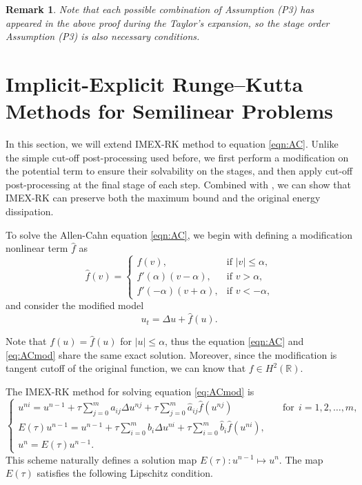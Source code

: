 \documentclass[a4paper, oneside]{book}
\def\bbR{{\mathbb{R}}}
\def\bbR{\mathbb{R}}
\def\hata{{\hat{a}}}
\def\hatb{{\hat{b}}}
\def\hatf{{\hat{f}}}
\newtheorem{remark}{Remark}[section]
\begin{document}
\begin{remark}
Note that each possible combination of Assumption (P3) has appeared in the above proof during the Taylor's expansion, 
so the stage order Assumption (P3) is also necessary conditions. 
\end{remark}

\section{Implicit-Explicit Runge--Kutta Methods for Semilinear Problems}
\label{sec:imex-nonlinear}



In this section, we will extend IMEX-RK method to equation \eqref{eqn:AC}. Unlike the simple cut-off post-processing used before, we first perform a modification on the potential term to ensure their solvability on the stages, and then apply cut-off post-processing at the final stage of each step. Combined with \cite{fu2024energy}, we can show that IMEX-RK can preserve both the maximum bound and the original energy dissipation. 

To solve the Allen-Cahn equation \eqref{eqn:AC}, we begin with defining a modification nonlinear term $\hatf$ as 
\begin{equation}
    \hatf(v)= \begin{cases}
    f(v), & \text{if $\lvert v \rvert \leq \alpha$,}\\ 
    f'(\alpha)(v-\alpha), &\text{if $v > \alpha$,}\\ 
    f'(-\alpha)(v+\alpha), &\text{if $v < -\alpha$,}
\end{cases}\end{equation}
and consider the modified model
\begin{equation}\label{eq:ACmod}
    u_t = \Delta u + \hatf(u).
\end{equation}

Note that $f(u) = \hatf(u)$ for $\lvert u \rvert \leq \alpha$, 
thus the equation \eqref{eqn:AC} and \eqref{eq:ACmod} share the same exact solution. 
Moreover, since the modification is tangent cutoff of the original function, 
we can know that $f \in H^2(\bbR)$. 


The IMEX-RK method for solving equation \eqref{eq:ACmod} is 
\begin{equation}\label{eq:RK-implicit-explicit-semilinear}
    \begin{cases}
    u^{ni} = u^{n-1} + \tau \sum_{j=0}^m a_{ij} \Delta u^{nj} + \tau \sum_{j=0}^m \hata_{ij} \hatf(u^{nj}) &\quad \text{for} ~~i=1,2,\dots,m, \\
    E(\tau) u^{n-1} = u^{n-1} + \tau \sum_{i=0}^m b_i \Delta u^{ni} + \tau \sum_{i=0}^m \hatb_i\hatf(u^{ni}), \\
    u^{n} = E(\tau) u^{n-1}.
  \end{cases}
\end{equation}
This scheme naturally defines a solution map $E(\tau): u^{n-1} \mapsto u^n$. The map $E(\tau)$ satisfies the following Lipschitz condition.
\end{document}
